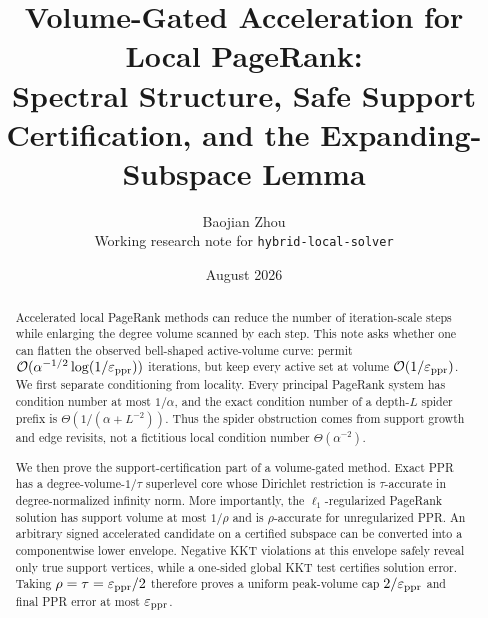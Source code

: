 \documentclass[11pt]{article}
\title{Volume-Gated Acceleration for Local PageRank:\\
Spectral Structure, Safe Support Certification, and the Expanding-Subspace Lemma}
\author{Baojian Zhou\\
\small Working research note for \texttt{hybrid-local-solver}}
\date{August 2026}
\begin{document}
\maketitle

\begin{abstract}
Accelerated local PageRank methods can reduce the number of iteration-scale
steps while enlarging the degree volume scanned by each step.  This note asks
whether one can flatten the observed bell-shaped active-volume curve: permit
$\mathcal{O}(\alpha^{-1/2}\log(1/\varepsilon_{\mathrm{ppr}}))$ iterations, but keep every active set
at volume $\mathcal{O}(1/\varepsilon_{\mathrm{ppr}})$.  We first separate conditioning from locality.
Every principal PageRank system has condition number at most $1/\alpha$, and
the exact condition number of a depth-$L$ spider prefix is
$\Theta(1/(\alpha+L^{-2}))$.  Thus the spider obstruction comes from support
growth and edge revisits, not a fictitious local condition number
$\Theta(\alpha^{-2})$.

We then prove the support-certification part of a volume-gated method.  Exact
PPR has a degree-volume-$1/\tau$ superlevel core whose Dirichlet restriction is
$\tau$-accurate in degree-normalized infinity norm.  More importantly, the
$\ell_1$-regularized PageRank solution has support volume at most $1/\rho$ and
is $\rho$-accurate for unregularized PPR.  An arbitrary signed accelerated
candidate on a certified subspace can be converted into a componentwise lower
envelope.  Negative KKT violations at this envelope safely reveal only true
support vertices, while a one-sided global KKT test certifies solution error.
Taking $\rho=\tau=\varepsilon_{\mathrm{ppr}}/2$ therefore proves a uniform peak-volume cap
$2/\varepsilon_{\mathrm{ppr}}$ and final PPR error at most $\varepsilon_{\mathrm{ppr}}$.


\end{abstract}
\end{document}

